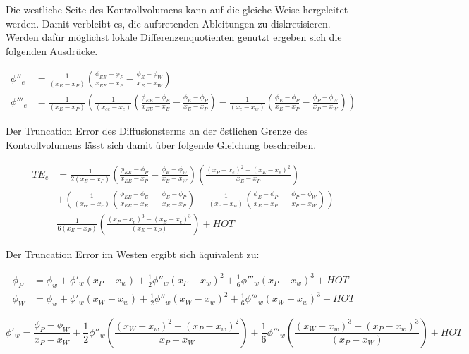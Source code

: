 \documentclass[10pt, ngerman,colorback,accentcolor=tud2d]{tudreport}
\begin{document}
Die westliche Seite des Kontrollvolumens kann auf die gleiche Weise hergeleitet werden.
Damit verbleibt es, die auftretenden Ableitungen zu diskretisieren. Werden dafür
möglichst lokale Differenzenquotienten genutzt ergeben sich die folgenden Ausdrücke.

\begin{align*}
  \phi''_e &= \frac{1}{(x_E-x_P)}\left({
\frac{\phi_{EE}-\phi_P}{x_{EE}-x_P}-\frac{\phi_E-\phi_W}{x_E-x_W}}\right)\\
\phi'''_e &= \frac{1}{(x_E-x_P)}\left({
\frac{1}{(x_{ee}-x_e)}
\left({\frac{\phi_{EE}-\phi_E}{x_{EE}-x_E}-\frac{\phi_E-\phi_P}{x_E-x_P} }\right)
-\frac{1}{(x_e-x_w)}
\left({\frac{\phi_E-\phi_P}{x_E-x_P} - \frac{\phi_P-\phi_W}{x_P-x_W}  }\right)
}\right)
\end{align*}


Der Truncation Error des Diffusionsterms an der östlichen Grenze des Kontrollvolumens
lässt sich damit über folgende Gleichung beschreiben.

\begin{align*}
  {TE}_e &= \frac{1}{2 (x_E-x_P)}\left({
\frac{\phi_{EE}-\phi_P}{x_{EE}-x_P}-\frac{\phi_E-\phi_W}{x_E-x_W}}\right) \left({\frac{{(x_P-x_e)}^2-{(x_E-x_e)}^2}{x_E-x_P}}\right)\\
&+
\left({
\frac{1}{(x_{ee}-x_e)}
\left({\frac{\phi_{EE}-\phi_E}{x_{EE}-x_E}-\frac{\phi_E-\phi_P}{x_E-x_P} }\right)
-\frac{1}{(x_e-x_w)}
\left({\frac{\phi_E-\phi_P}{x_E-x_P} - \frac{\phi_P-\phi_W}{x_P-x_W}  }\right)
}\right)\\
&\frac{1}{6(x_E-x_P)}\left({\frac{{(x_P-x_e)}^3-{(x_E-x_e)}^3}{(x_E-x_P)}}\right)
+HOT
\end{align*}

Der Truncation Error im Westen ergibt sich äquivalent zu:

\begin{align}
  \phi_P &= \phi_w + \phi'_w(x_P-x_w)+\frac{1}{2}\phi''_w(x_P-x_w)^2
  +\frac{1}{6}\phi'''_w(x_P-x_w)^3+HOT
  \label{eq:taylor_wP}\\
  \phi_W &= \phi_w + \phi'_w(x_W-x_w)+\frac{1}{2}\phi''_w(x_W-x_w)^2
  +\frac{1}{6}\phi'''_w(x_W-x_w)^3+HOT
  \label{eq:taylor_eP}
\end{align}

\begin{equation}
  \phi'_w = \frac{\phi_P-\phi_W}{x_P-x_W}+\frac{1}{2}\phi''_w
\left({\frac{{(x_W-x_w)}^2-{(x_P-x_w)}^2}{x_P-x_W}}\right)+
\frac{1}{6} \phi'''_w \left({\frac{{(x_W-x_w)}^3-{(x_P-x_w)}^3}{(x_P-x_W)}}\right)+HOT
\end{equation}
\end{document}
